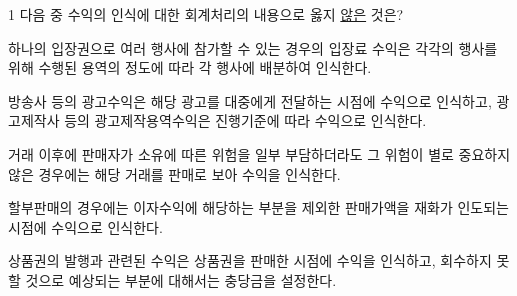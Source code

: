 \begin{question}{1}
다음 중 수익의 인식에 대한 회계처리의 내용으로 옳지 \uline{않은} 것은?
\begin{choices}
  \item 하나의 입장권으로 여러 행사에 참가할 수 있는 경우의 입장료 수익은 각각의 행사를 위해 수행된 용역의 정도에 따라 각 행사에 배분하여 인식한다.
  \item 방송사 등의 광고수익은 해당 광고를 대중에게 전달하는 시점에 수익으로 인식하고, 광고제작사 등의 광고제작용역수익은 진행기준에 따라 수익으로 인식한다.
  \item 거래 이후에 판매자가 소유에 따른 위험을 일부 부담하더라도 그 위험이 별로 중요하지 않은 경우에는 해당 거래를 판매로 보아 수익을 인식한다.
  \item 할부판매의 경우에는 이자수익에 해당하는 부분을 제외한 판매가액을 재화가 인도되는 시점에 수익으로 인식한다.
  \item 상품권의 발행과 관련된 수익은 상품권을 판매한 시점에 수익을 인식하고, 회수하지 못할 것으로 예상되는 부분에 대해서는 충당금을 설정한다.
\end{choices}
\end{question}
